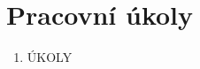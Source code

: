 \documentclass[a4paper]{article}
\author{Vladislav Wohlrath}
\begin{document}
\begin{titlepage}

\end{titlepage}

\section*{Pracovní úkoly}
\begin{enumerate}
\item ÚKOLY
\end{enumerate}












\printbibliography[title={Seznam použité literatury}]
\end{document}
